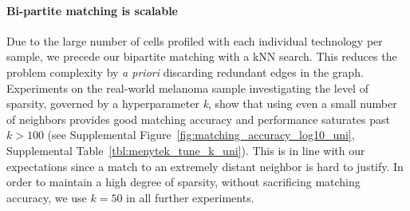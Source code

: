 
\paragraph{Bi-partite matching is scalable}
Due to the large number of cells profiled with each individual technology per sample, we precede our bipartite matching with a kNN search.
This reduces the problem complexity by \textit{a priori} discarding redundant edges in the graph.
Experiments on the real-world melanoma sample investigating the level of sparsity, governed by a hyperparameter \textit{k}, show that using even a small number of neighbors provides good matching accuracy and performance saturates past $k>100$ (see Supplemental Figure~\ref{fig:matching_accuracy_log10_uni}, Supplemental Table~\ref{tbl:menytek_tune_k_uni}).
This is in line with our expectations since a match to an extremely distant neighbor is hard to justify.
In order to maintain a high degree of sparsity, without sacrificing matching accuracy, we use $k=50$ in all further experiments.


